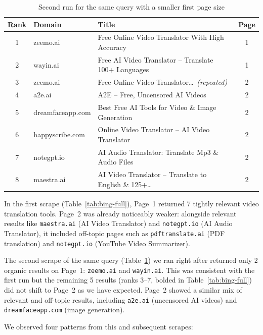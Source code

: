 \begin{table}[htbp]
\centering
\caption{Second run for the same query with a smaller first page size}
\label{tab:bing-truncated}
\small
\begin{tabular}{@{}clp{6.5cm}c@{}}
\toprule
\textbf{Rank} & \textbf{Domain} & \textbf{Title} & \textbf{Page} \\
\midrule
1 & zeemo.ai & Free Online Video Translator With High Accuracy & 1 \\
2 & wayin.ai & Free AI Video Translator -- Translate 100+ Languages & 1 \\
\midrule
3 & zeemo.ai & Free Online Video Translator\ldots\ \textit{(repeated)} & 2 \\
4 & a2e.ai & A2E -- Free, Uncensored AI Videos & 2 \\
5 & dreamfaceapp.com & Best Free AI Tools for Video \& Image Generation & 2 \\
6 & happyscribe.com & Online Video Translator -- AI Video Translator & 2 \\
7 & notegpt.io & AI Audio Translator: Translate Mp3 \& Audio Files & 2 \\
8 & maestra.ai & AI Video Translator -- Translate to English \& 125+\ldots & 2 \\
\bottomrule
\end{tabular}
\end{table}

In the first scrape (Table~\ref{tab:bing-full}), Page~1 returned 7 tightly relevant video translation tools. Page~2 was already noticeably weaker: alongside relevant results like \texttt{maestra.ai} (AI Video Translator) and \texttt{notegpt.io} (AI Audio Translator), it included off-topic pages such as \texttt{pdftranslate.ai} (PDF translation) and \texttt{notegpt.io} (YouTube Video Summarizer).

The second scrape of the same query (Table~\ref{tab:bing-truncated}) we ran right after returned
 only 2 organic results on Page~1: \texttt{zeemo.ai} and \texttt{wayin.ai}. This was consistent with the first run
 but the remaining 5 results (ranks 3--7, bolded in Table~\ref{tab:bing-full}) did not shift to Page~2 as we have expected.
 Page~2 showed a similar mix of relevant and off-topic results, including \texttt{a2e.ai} (uncensored AI videos) and \texttt{dreamfaceapp.com} (image generation).

We observed four patterns from this and subsequent scrapes:


